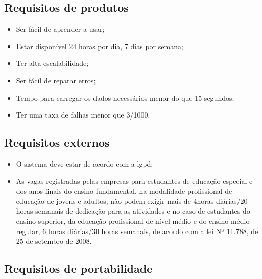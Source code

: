 \subsection{Requisitos de produtos}

\begin{itemize}
	\item Ser fácil de aprender a usar;
	\item Estar disponível 24 horas por dia, 7 dias por semana;
	\item Ter alta escalabilidade;
	\item Ser fácil de reparar erros;
	\item Tempo para carregar os dados necessários menor do que 15 segundos;
	\item Ter uma taxa de falhas menor que 3/1000.
\end{itemize}

\subsection{Requisitos externos}

\begin{itemize}
	\item O sistema deve estar de acordo com a \ac{lgpd};
	\item As vagas registradas pelas empresas para estudantes de educação especial e dos anos finais do ensino fundamental, na modalidade profissional de educação de jovens e adultos, não podem exigir mais de 4horas diárias/20 horas semanais de dedicação para as atividades e no caso de estudantes do ensino superior, da educação profissional de nível médio e do ensino médio regular, 6 horas diárias/30 horas semanais, de acordo com a lei Nº 11.788, de  25 de setembro de 2008.
\end{itemize}

\subsection{Requisitos de portabilidade}

